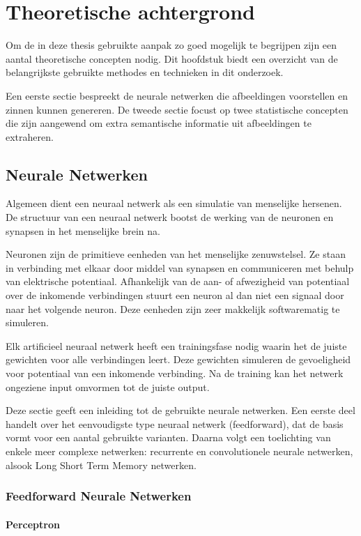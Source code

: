 \chapter{Theoretische achtergrond}
\label{hst-theorie}
Om de in deze thesis gebruikte aanpak zo goed mogelijk te begrijpen zijn een aantal theoretische concepten nodig. Dit hoofdstuk biedt een overzicht van de belangrijkste gebruikte methodes en technieken in dit onderzoek.

Een eerste sectie bespreekt de neurale netwerken die afbeeldingen voorstellen en zinnen kunnen genereren. De tweede sectie focust op twee statistische concepten die zijn aangewend om extra semantische informatie uit afbeeldingen te extraheren. 

\section{Neurale Netwerken}
Algemeen dient een neuraal netwerk als een simulatie van menselijke hersenen. De structuur van een neuraal netwerk bootst de werking van de neuronen en synapsen in het menselijke brein na. 

Neuronen zijn de primitieve eenheden van het menselijke zenuwstelsel. Ze staan in verbinding met elkaar door middel van synapsen en communiceren met behulp van elektrische potentiaal. Afhankelijk van de aan- of afwezigheid van potentiaal over de inkomende verbindingen stuurt een neuron al dan niet een signaal door naar het volgende neuron. Deze eenheden zijn zeer makkelijk softwarematig te simuleren.

Elk artificieel neuraal netwerk heeft een trainingsfase nodig waarin het de juiste gewichten voor alle verbindingen leert. Deze gewichten simuleren de gevoeligheid voor potentiaal van een inkomende verbinding. Na de training kan het netwerk ongeziene input omvormen tot de juiste output.

Deze sectie geeft een inleiding tot de gebruikte neurale netwerken. Een eerste deel handelt over het eenvoudigste type neuraal netwerk (feedforward), dat de basis vormt voor een aantal gebruikte varianten. Daarna volgt een toelichting van enkele meer complexe netwerken: recurrente en convolutionele neurale netwerken, alsook Long Short Term Memory netwerken.

\subsection{Feedforward Neurale Netwerken}
\subsubsection{Perceptron} %
\label{par:perceptron}

